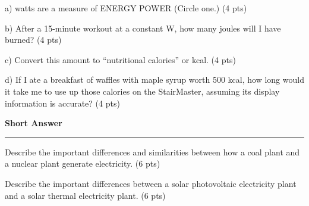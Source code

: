 \documentclass[12pt, oneside]{article}
\newif\ifsolution
\newcommand{\chead}[1]
{\begin{center}\large\textbf{#1}\end{center}
\hrule
\vspace{10pt}}
\newcommand{\solution}[1]
{\ifsolution
Answer: {\it #1}
\else\fi}
\begin{document}
a)  watts are a measure of
\hspace{1cm}
ENERGY
\hspace{1cm}
POWER
\hspace{1cm}
(Circle one.) (4 pts)

\solution{Power}

b) After a 15-minute workout at a constant  W, how many joules will I
have burned? (4 pts)

\solution{
Energy equals power multiplied by time.

$$ 200W \cdot 15 min \cdot \frac{60 sec}{1 min} = \py{kilojoules} kJ $$
}

\vfill

c) Convert this amount to “nutritional calories” or kcal. (4 pts)

\solution{
$$180 kJ \cdot \frac{1000J}{kJ} \cdot \frac{1 kcal}{4186 J} = 43 kcal $$
}

\vfill

d) If I ate a breakfast of waffles with maple syrup worth 500 kcal, how
long would it take me to use up those calories on the StairMaster,
assuming its display information is accurate? (4 pts)

\solution{
Here I assume that we are 100\% efficient in the conversion of food chemical
energy to kinetic energy.  Using energy equals power multiplied by time
and the rate of energy use we determined in c:

$$ 500 kcal = \frac{43 kcal}{15 min} \cdot X min $$
$$ X = 500 kcal \cdot  \frac{15 min}{43 kcal} = 174 min $$

Which is slightly less than 3 hours.
}

\vfill



\newpage
\chead{Short Answer}

Describe the important differences and similarities between how a coal
plant and a nuclear plant generate electricity. (6 pts)

\solution{The main difference is in the source of heat.  The main
similarity is in the use of steam turbines to generate electricity.}

\vfill

Describe the important differences between a solar photovoltaic
electricity plant and a solar thermal electricity plant. (6 pts)

\solution{Solar PV electricity creates direct current electricity
without a  thermal cycle while solar thermal electricity uses technology
Rankine cycle steam turbines to generate AC electricity.}
\end{document}

